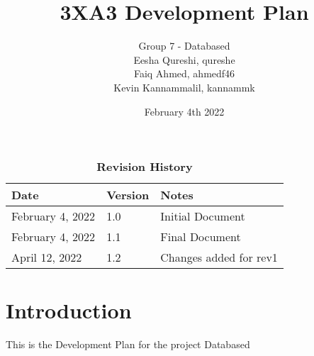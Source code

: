 \documentclass[12pt,letterpaper]{article}
\title{3XA3 Development Plan}
\author{Group 7 - Databased \\ Eesha Qureshi, qureshe \\ Faiq Ahmed, ahmedf46 \\ Kevin Kannammalil, kannammk}
\date{February 4th 2022}
\begin{document}
\maketitle



\newpage
\tableofcontents

\begin{table}[H]
\caption{\bf Revision History}
\begin{tabularx}{\textwidth}{p{3cm}p{2cm}X}
\toprule {\bf Date} & {\bf Version} & {\bf Notes}\\
\midrule
February 4, 2022 & 1.0 & Initial Document \\
February 4, 2022 & 1.1 & Final Document \\
{\color{red}April 12, 2022} & {\color{red}1.2} & {\color{red}Changes added for rev1} \\
\bottomrule
\end{tabularx}
\end{table}

\newpage
\section{Introduction}

This is the Development Plan for the project Databased
\end{document}
